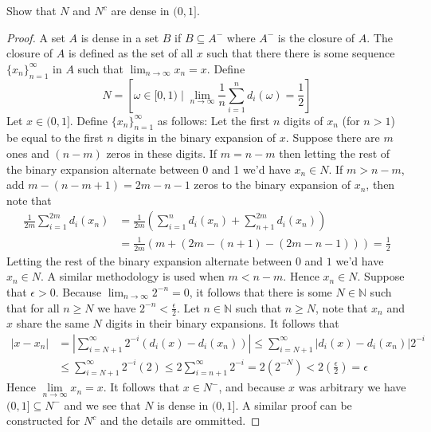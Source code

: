 \documentclass[12pt]{article}
\newcommand{\N}{\mathbb{N}}
\newcommand{\seq}{\subseteq}
\newcommand{\e}{\epsilon}
\newcommand{\Lim}{\lim\limits}
\newenvironment{exercise}[2][Exercise]{\begin{trivlist}
\item[\hskip \labelsep {\bfseries #1}\hskip \labelsep {\bfseries #2.}]}{\end{trivlist}}
\begin{document}
\begin{exercise}{1.2}
    Show that $N$ and $N^c$ are dense in $(0, 1]$.
\end{exercise}
\begin{proof}
    A set $A$ is dense in a set $B$ if $B \seq A^{-}$ where $A^{-}$ is the closure of $A$. The closure of $A$ is defined as the set of all $x$ such that there there is some sequence $\{ x_{n} \}_{n=1}^{\infty}$ in $A$ such that $\lim_{n \to \infty} x_n = x$. Define \[ N = \left [ \omega \in [0, 1) \mid \lim_{n \to \infty} \frac{1}{n} \sum_{i=1}^{n} d_i (\omega) = \frac{1}{2} \right ] \]
    Let $x \in (0, 1]$. Define $\{ x_{n} \}_{n=1}^{\infty}$ as follows: Let the first $n$ digits of $x_n$ (for $n > 1$) be equal to the first $n$ digits in the binary expansion of $x$. Suppose there are $m$ ones and $(n-m)$ zeros in these digits. If $m = n-m$ then letting the rest of the binary expansion alternate between 0 and 1 we'd have $x_n \in N$. If $m > n-m$, add $m-(n-m+1) = 2m - n - 1$ zeros to the binary expansion of $x_n$, then note that
    \begin{align*}
        \frac{1}{2m} \sum_{i=1}^{2m} d_i (x_n) &= \frac{1}{2m} \left (\sum_{i=1}^{n} d_i (x_n) + \sum_{n+1}^{2m} d_i (x_n) \right) \\
        &= \frac{1}{2m} \left ( m + (2m-(n+1) - (2m-n-1)) \right ) = \frac{1}{2}
    \end{align*}
    Letting the rest of the binary expansion alternate between $0$ and $1$ we'd have $x_n \in N$. A similar methodology is used when $m < n-m$. Hence $x_n \in N$. Suppose that $\e > 0$. Because $\lim_{n \to \infty} 2^{-n} = 0$, it follows that there is some $N \in \N$ such that for all $n \geq N$ we have $2^{-n} < \frac{\e}{2}$. Let $n \in \N$ such that $n \geq N$, note that $x_n$ and $x$ share the same $N$ digits in their binary expansions. It follows that
    \begin{align*}
        |x-x_n| &= \left | \sum_{i=N+1}^{\infty} 2^{-i}  (d_i (x) - d_i(x_n))\right | \leq \sum_{i=N+1}^{\infty} |d_i (x) - d_i (x_n)| 2^{-i} \\
        &\leq \sum_{i=N+1}^{\infty} 2^{-i} (2) \leq 2 \sum_{i=n+1}^{\infty} 2^{-i} = 2(2^{-N}) < 2 \left (\frac{\e}{2} \right) = \e
    \end{align*}
    Hence $\Lim_{n \to \infty} x_n = x$. It follows that $x \in N^{-}$, and because $x$ was arbitrary we have $(0, 1] \seq N^{-}$ and we see that $N$ is dense in $(0, 1]$. A similar proof can be constructed for $N^{c}$ and the details are ommitted.
\end{proof}
\end{document}
